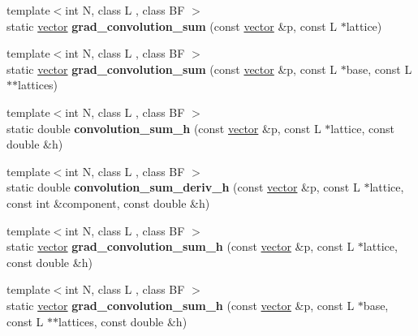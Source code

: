 \begin{DoxyCompactItemize}
\item 
\mbox{\label{classsisl_1_1basis__function_afacf657c3306f83ae42d73978ee38a47}} 
{\footnotesize template$<$int N, class L , class BF $>$ }\\static \hyperlink{namespacesisl_a2069bd5374a9be042ff3ce3306d41e1a}{vector} {\bfseries grad\+\_\+convolution\+\_\+sum} (const \hyperlink{namespacesisl_a2069bd5374a9be042ff3ce3306d41e1a}{vector} \&p, const L $\ast$lattice)
\item 
\mbox{\label{classsisl_1_1basis__function_ae4e59e60ccac8d4060a417f9f0353d53}} 
{\footnotesize template$<$int N, class L , class BF $>$ }\\static \hyperlink{namespacesisl_a2069bd5374a9be042ff3ce3306d41e1a}{vector} {\bfseries grad\+\_\+convolution\+\_\+sum} (const \hyperlink{namespacesisl_a2069bd5374a9be042ff3ce3306d41e1a}{vector} \&p, const L $\ast$base, const L $\ast$$\ast$lattices)
\item 
\mbox{\label{classsisl_1_1basis__function_aa7171cdb11702fcc6bfe49de1925a1a4}} 
{\footnotesize template$<$int N, class L , class BF $>$ }\\static double {\bfseries convolution\+\_\+sum\+\_\+h} (const \hyperlink{namespacesisl_a2069bd5374a9be042ff3ce3306d41e1a}{vector} \&p, const L $\ast$lattice, const double \&h)
\item 
\mbox{\label{classsisl_1_1basis__function_a1bed96cde85d879444b965f7d3c9199d}} 
{\footnotesize template$<$int N, class L , class BF $>$ }\\static double {\bfseries convolution\+\_\+sum\+\_\+deriv\+\_\+h} (const \hyperlink{namespacesisl_a2069bd5374a9be042ff3ce3306d41e1a}{vector} \&p, const L $\ast$lattice, const int \&component, const double \&h)
\item 
\mbox{\label{classsisl_1_1basis__function_a5e9afa1d8e02b37de4fc6d38fcf79b56}} 
{\footnotesize template$<$int N, class L , class BF $>$ }\\static \hyperlink{namespacesisl_a2069bd5374a9be042ff3ce3306d41e1a}{vector} {\bfseries grad\+\_\+convolution\+\_\+sum\+\_\+h} (const \hyperlink{namespacesisl_a2069bd5374a9be042ff3ce3306d41e1a}{vector} \&p, const L $\ast$lattice, const double \&h)
\item 
\mbox{\label{classsisl_1_1basis__function_aaee0095420132eb4a2b798c3ec135ce9}} 
{\footnotesize template$<$int N, class L , class BF $>$ }\\static \hyperlink{namespacesisl_a2069bd5374a9be042ff3ce3306d41e1a}{vector} {\bfseries grad\+\_\+convolution\+\_\+sum\+\_\+h} (const \hyperlink{namespacesisl_a2069bd5374a9be042ff3ce3306d41e1a}{vector} \&p, const L $\ast$base, const L $\ast$$\ast$lattices, const double \&h)
\end{DoxyCompactItemize}


